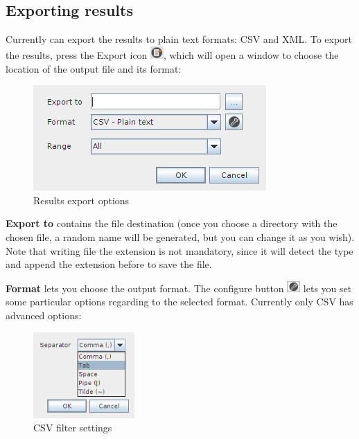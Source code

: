 \documentclass[a4paper]{article}
\begin{document}
	\subsection{Exporting results}
	Currently can export the results to plain text formats: CSV and XML. To export the results, press the Export icon \includegraphics[width=0.5cm]{img/icon_export.png}, which will open a window to choose the location of the output file and its format:
	\begin{figure}[h!]
		\centering
		\includegraphics[width=0.5\linewidth]{img/query_result_exportmenu.png}
		\caption{Results export options}
		\label{fig:query_result_exportmenu}
	\end{figure}
	
	\textbf{Export to} contains the file destination (once you choose a directory with the chosen file, a random name will be generated, but you can change it as you wish). Note that writing file the extension is not mandatory, since it will detect the type and append the extension before to save the file.  
	
	\textbf{Format} lets you choose the output format. The configure button \includegraphics[width=0.5cm]{img/icon_edit_saved_query.png} lets you set some particular options regarding to the selected format. Currently only CSV has advanced options:		
	\begin{figure}[h!]
		\centering
		\includegraphics[width=0.3\linewidth]{img/query_exports_settings.png}
		\caption{CSV filter settings}
		\label{fig:query_exports_settings}
	\end{figure}
	
\end{document}

